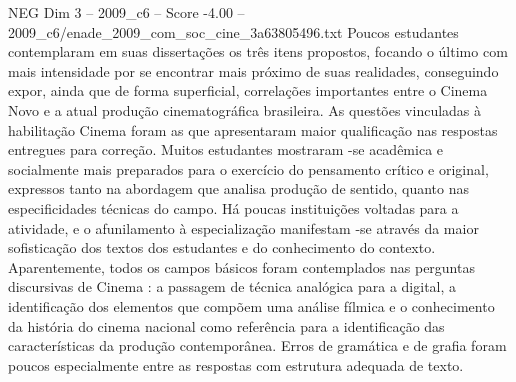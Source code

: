\begin{textsample}{NEG Dim 3 – 2009\_c6 – Score -4.00 – 2009\_c6/enade\_2009\_com\_soc\_cine\_3a63805496.txt}
Poucos estudantes contemplaram em suas dissertações os três itens propostos, focando o último com mais intensidade por se encontrar mais próximo de suas realidades, conseguindo expor, ainda que de forma superficial, correlações importantes entre o Cinema Novo e a atual produção cinematográfica brasileira.
As questões vinculadas à habilitação Cinema foram as que apresentaram maior qualificação nas respostas entregues para correção.
Muitos estudantes mostraram -se acadêmica e socialmente mais preparados para o exercício do pensamento crítico e original, expressos tanto na abordagem que analisa produção de sentido, quanto nas especificidades técnicas do campo.
Há poucas instituições voltadas para a atividade, e o afunilamento à especialização manifestam -se através da maior sofisticação dos textos dos estudantes e do conhecimento do contexto.
Aparentemente, todos os campos básicos foram contemplados nas perguntas discursivas de Cinema : a passagem de técnica analógica para a digital, a identificação dos elementos que compõem uma análise fílmica e o conhecimento da história do cinema nacional como referência para a identificação das características da produção contemporânea.
Erros de gramática e de grafia foram poucos especialmente entre as respostas com estrutura adequada de texto.

\end{textsample}
